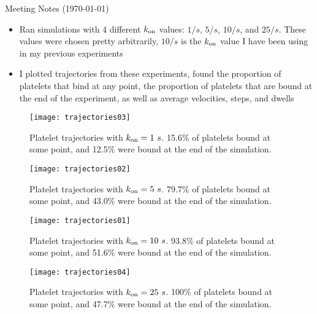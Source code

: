\documentclass{article}
\newcommand{\tn}{\textnormal}
\begin{document}
\pagestyle{plain}

\begin{center}
  {\Large Meeting Notes (\today)}
\end{center}

\begin{itemize}
\item Ran simulations with 4 different $k_\tn{on}$ values: $1 / s$, $5
  / s$, $10 / s$, and $25 / s$. These values were chosen pretty
  arbitrarily, $10 / s$ is the $k_\tn{on}$ value I have been using in
  my previous experiments
\item I plotted trajectories from these experiments, found the
  proportion of platelets that bind at any point, the proportion of
  platelets that are bound at the end of the experiment, as well as
  average velocities, steps, and dwells
\end{itemize}

\begin{figure}[h]
  \centering
  \texttt{[image: trajectories03]}
  \caption{Platelet trajectories with $k_\tn{on} = 1 \ s$. 15.6\% of
    platelets bound at some point, and 12.5\% were bound at the end of
  the simulation.}
  \label{fig:traj03}
\end{figure}

\begin{figure}
  \centering
  \texttt{[image: trajectories02]}
  \caption{Platelet trajectories with $k_\tn{on} = 5 \ s$. 79.7\% of
    platelets bound at some point, and 43.0\% were bound at the end of
  the simulation.}
  \label{fig:traj02}
\end{figure}

\begin{figure}
  \centering
  \texttt{[image: trajectories01]}
  \caption{Platelet trajectories with $k_\tn{on} = 10 \ s$. 93.8\% of
    platelets bound at some point, and 51.6\% were bound at the end of
  the simulation.}
  \label{fig:traj01}
\end{figure}

\begin{figure}
  \centering
  \texttt{[image: trajectories04]}
  \caption{Platelet trajectories with $k_\tn{on} = 25 \ s$. 100\% of
    platelets bound at some point, and 47.7\% were bound at the end of
  the simulation.}
  \label{fig:traj04}
\end{figure}

\end{document}
